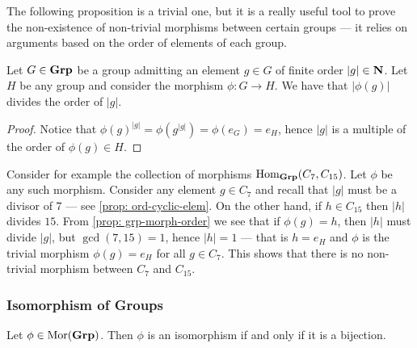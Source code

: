 The following proposition is a trivial one, but it is a really useful tool to
prove the non-existence of non-trivial morphisms between certain groups --- it
relies on arguments based on the order of elements of each group.

\begin{proposition}\label{prop: grp-morph-order}
Let \(G \in {\textbf{Grp}}\) be a group admitting an element \(g \in G\) of finite order
\(|g| \in \mathbf{N}\). Let \(H\) be any group and consider the morphism \(\phi: G \to
H\). We have that \(|\phi(g)|\) divides the order of \(|g|\).
\end{proposition}

\begin{proof}
Notice that \({\phi(g)}^{|g|} = \phi(g^{|g|}) = \phi(e_G) = e_H\), hence \(|g|\)
is a multiple of the order of \(\phi(g) \in H\).
\end{proof}

\begin{example}
Consider for example the collection of morphisms \(\operatorname{Hom}_{\textbf{Grp}}(C_7, C_{15})\).
Let \(\phi\) be any such morphism. Consider any element \(g \in C_7\) and
recall that \(|g|\) must be a divisor of \(7\) --- see \cref{prop:
ord-cyclic-elem}. On the other hand, if \(h \in C_{15}\) then \(|h|\) divides
\(15\). From \cref{prop: grp-morph-order} we see that if \(\phi(g) = h\), then
\(|h|\) must divide \(|g|\), but \(\gcd(7, 15) = 1\), hence
\(|h| = 1\) --- that is \(h = e_H\) and \(\phi\) is the trivial morphism
\(\phi(g) = e_H\) for all \(g \in C_7\). This shows that there is no
non-trivial morphism between \(C_7\) and \(C_{15}\).
\end{example}

\subsubsection{Isomorphism of Groups}

\begin{proposition}\label{prop: grp-iso-bij}
Let \(\phi \in \operatorname{Mor}({\textbf{Grp}})\). Then \(\phi\) is an isomorphism if and only if it
is a bijection.
\end{proposition}


